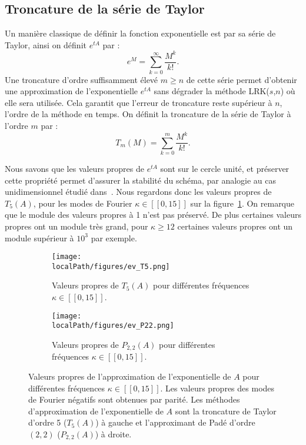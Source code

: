 \subsection{Troncature de la série de Taylor}

Un manière classique de définir la fonction exponentielle est par sa série de Taylor, ainsi on définit $e^{tA}$ par :
$$
  e^{M} = \sum_{k=0}^\infty \frac{M^k}{k!}.
$$
Une troncature d'ordre suffisamment élevé $m\geq n$ de cette série permet d'obtenir une approximation de l'exponentielle $e^{tA}$ sans dégrader la méthode LRK($s$,$n$) où elle sera utilisée. Cela garantit que l'erreur de troncature reste supérieur à $n$, l'ordre de la méthode en temps. On définit la troncature de la série de Taylor à l'ordre $m$ par :
$$
  T_m(M) = \sum_{k=0}^m \frac{M^k}{k!}.
$$

Nous savons que les valeurs propres de $e^{tA}$ sont sur le cercle unité, et préserver cette propriété permet d'assurer la stabilité du schéma, par analogie au cas unidimensionnel étudié dans~\cite{Crouseilles:2019b}. Nous regardons donc les valeurs propres de $T_5(A)$, pour les modes de Fourier $\kappa\in[\![0,15]\!]$ sur la figure~\ref{fig:ev:T5}. On remarque que le module des valeurs propres à 1 n'est pas préservé. De plus certaines valeurs propres ont un module très grand, pour $\kappa\geq12$ certaines valeurs propres ont un module supérieur à $10^3$ par exemple.

\begin{figure}
  \begin{subfigure}{.5\textwidth}
    \centering
    \texttt{[image: \\localPath/figures/ev\_T5.png]}
    \caption{Valeurs propres de $T_5(A)$ pour différentes fréquences $\kappa\in[\![0,15]\!]$.}
    \label{fig:ev:T5}
  \end{subfigure}
  \begin{subfigure}{.5\textwidth}
    \texttt{[image: \\localPath/figures/ev\_P22.png]}
    \caption{Valeurs propres de $P_{2,2}(A)$ pour différentes fréquences $\kappa\in[\![0,15]\!]$.}
    \label{fig:ev:P22}
  \end{subfigure}
  \caption{Valeurs propres de l'approximation de l'exponentielle de $A$ pour différentes fréquences $\kappa\in[\![0,15]\!]$. Les valeurs propres des modes de Fourier négatifs sont obtenues par parité. Les méthodes d'approximation de l'exponentielle de $A$ sont la troncature de Taylor d'ordre 5 ($T_5(A)$) à gauche et l'approximant de Padé d'ordre $(2,2)$ ($P_{2,2}(A)$) à droite.}
\end{figure}

